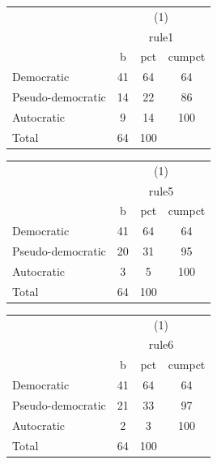{
\def\sym#1{\ifmmode^{#1}\else\(^{#1}\)\fi}
\begin{tabular}{l*{1}{ccc}}
\toprule
            &\multicolumn{3}{c}{(1)}               \\
            &\multicolumn{3}{c}{rule1}             \\
            &           b&         pct&      cumpct\\
\midrule
Democratic  &          41&          64&          64\\
Pseudo-democratic&          14&          22&          86\\
Autocratic  &           9&          14&         100\\
Total       &          64&         100&            \\
\bottomrule
\end{tabular}
}
{
\def\sym#1{\ifmmode^{#1}\else\(^{#1}\)\fi}
\begin{tabular}{l*{1}{ccc}}
\toprule
            &\multicolumn{3}{c}{(1)}               \\
            &\multicolumn{3}{c}{rule5}             \\
            &           b&         pct&      cumpct\\
\midrule
Democratic  &          41&          64&          64\\
Pseudo-democratic&          20&          31&          95\\
Autocratic  &           3&           5&         100\\
Total       &          64&         100&            \\
\bottomrule
\end{tabular}
}
{
\def\sym#1{\ifmmode^{#1}\else\(^{#1}\)\fi}
\begin{tabular}{l*{1}{ccc}}
\toprule
            &\multicolumn{3}{c}{(1)}               \\
            &\multicolumn{3}{c}{rule6}             \\
            &           b&         pct&      cumpct\\
\midrule
Democratic  &          41&          64&          64\\
Pseudo-democratic&          21&          33&          97\\
Autocratic  &           2&           3&         100\\
Total       &          64&         100&            \\
\bottomrule
\end{tabular}
}
